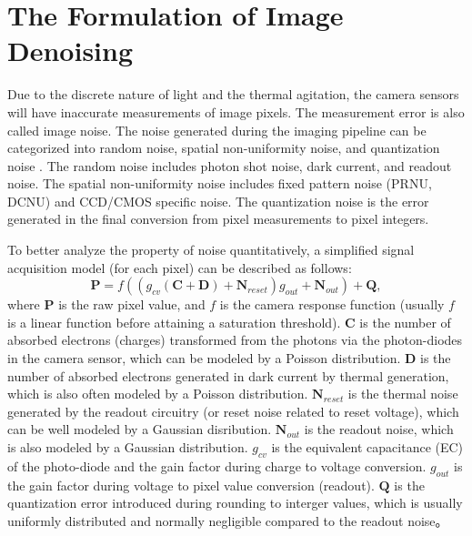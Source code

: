 \section{The Formulation of Image Denoising}
\label{sec:intro:current}

Due to the discrete nature of light and the thermal agitation, the camera sensors will have inaccurate measurements of image pixels. The measurement error is also called image noise. The noise generated during the imaging pipeline can be categorized into random noise, spatial non-uniformity noise, and quantization noise \cite{healey1994radiometric,Foipractical}. The random noise includes photon shot noise, dark current, and readout noise. The spatial non-uniformity noise includes fixed pattern noise (PRNU, DCNU) and CCD/CMOS specific noise. The quantization noise is the error generated in the final conversion from pixel measurements to pixel integers.

To better analyze the property of noise quantitatively, a simplified signal acquisition model \cite{Foipractical} (for each pixel) can be described as follows:
\begin{equation}
\label{e11}
\bm{P} = f((g_{cv}(\bm{C}+\bm{D})+\bm{N}_{reset})g_{out}+\bm{N}_{out})+\bm{Q},
\end{equation}
where $\bm{P}$ is the raw pixel value, and $f$ is the camera response function (usually $f$ is a linear function before attaining a saturation threshold). $\bm{C}$ is the number of absorbed electrons (charges) transformed from the photons via the photon-diodes in the camera sensor, which can be modeled by a Poisson distribution. $\bm{D}$ is the number of absorbed electrons generated in dark current by thermal generation, which is also often modeled by a Poisson distribution. $\bm{N}_{reset}$ is the thermal noise generated by the readout circuitry (or reset noise related to reset voltage), which can be well modeled by a Gaussian disribution. $\bm{N}_{out}$ is the readout noise, which is also modeled by a Gaussian distribution. $g_{cv}$ is the equivalent capacitance (EC) of the photo-diode and the gain factor during charge to voltage conversion. $g_{out}$ is the gain factor during voltage to pixel value conversion (readout). $\bm{Q}$ is the quantization error introduced during rounding to interger values, which is usually uniformly distributed and normally negligible compared to the readout noise。

